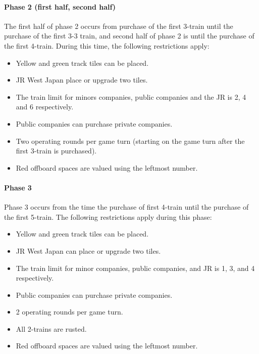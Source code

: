 \documentclass{article}
\begin{document}
\begin{CJK}{UTF8}{min}
\paragraph*{Phase 2 (first half, second half)}
The first half of phase 2 occurs from purchase of the first 3-train
until the purchase of the first 3-3 train, and second half of phase 2
is until the purchase of the first 4-train. During this time, the
following restrictions apply:
\begin{itemize}
\item Yellow and green track tiles can be placed.
\item JR West Japan place or upgrade two tiles.
\item The train limit for minors companies, public companies and the JR is
  2, 4 and 6 respectively.
\item Public companies can purchase private companies.
\item Two operating rounds per game turn (starting on the game turn after
  the first 3-train is purchased).
\item Red offboard spaces are valued using the leftmost number.
\end{itemize}

\paragraph*{Phase 3}
Phase 3 occurs from the time the purchase of first 4-train until the
purchase of the first 5-train. The following restrictions apply during
this phase:
\begin{itemize}
\item Yellow and green track tiles can be placed.
\item JR West Japan can place or upgrade two tiles.
\item The train limit for minor companies, public companies, and JR is
  1, 3, and 4 respectively.
\item Public companies can purchase private companies.
\item 2 operating rounds per game turn.
\item All 2-trains are rusted.
\item Red offboard spaces are valued using the leftmost number.
\end{itemize}


\end{CJK}
\end{document}

